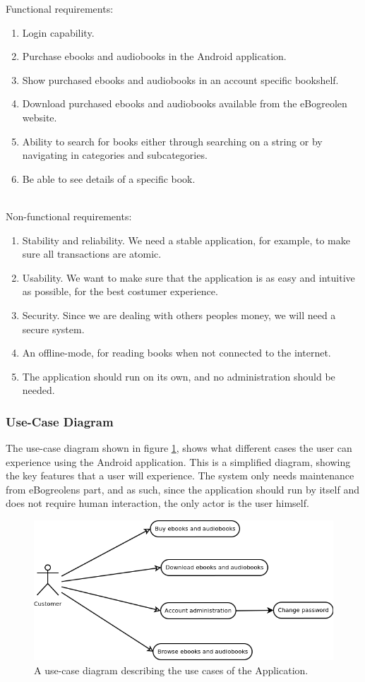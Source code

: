 \documentclass[12pt]{article}
\begin{document}
Functional requirements:
\begin{enumerate}
\item Login capability.
\item Purchase ebooks and audiobooks in the Android application.
\item Show purchased ebooks and audiobooks in an account specific bookshelf.
\item Download purchased ebooks and audiobooks available from the eBogreolen website.
\item Ability to search for books either through searching on a string or by navigating in categories and subcategories.
\item Be able to see details of a specific book.
\end{enumerate}
$ $\\
Non-functional requirements:
\begin{enumerate}
\item Stability and reliability. We need a stable application, for example, to make sure all transactions are atomic.
\item Usability. We want to make sure that the application is as easy and intuitive as possible, for the best costumer experience.
\item Security. Since we are dealing with others peoples money, we will need a secure system.
\item An offline-mode, for reading books when not connected to the internet.
\item The application should run on its own, and no administration should be needed.
\end{enumerate}

\subsubsection{Use-Case Diagram}

The use-case diagram shown in figure \ref{casemodel}, shows what different cases the user can experience using the Android application. This is a simplified diagram, showing the key features that a user will experience. The system only needs maintenance from eBogreolens part, and as such, since the application should run by itself and does not require human interaction, the only actor is the user himself.
\begin{figure}[H]
\center
\includegraphics[scale=0.7]{Casemodel.png}
\caption{A use-case diagram describing the use cases of the Application.}
\label{casemodel}
\end{figure}
\end{document}
